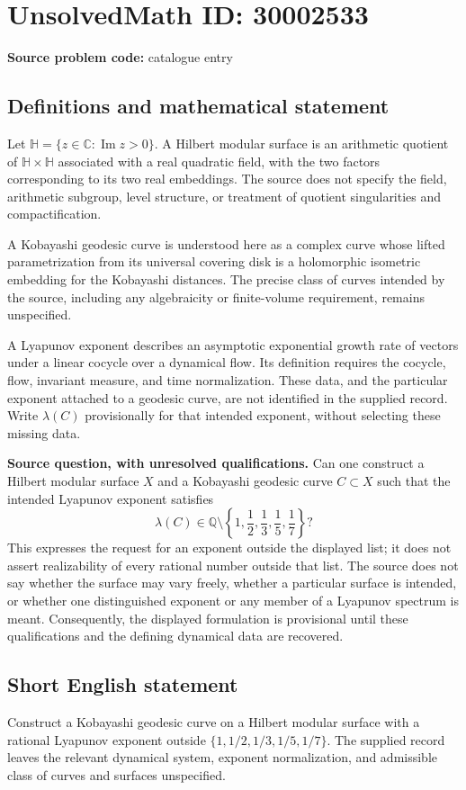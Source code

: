 \documentclass[11pt]{article}
\newcommand{\Q}{\mathbb{Q}}
\newcommand{\C}{\mathbb{C}}
\begin{document}
\section*{UnsolvedMath ID: 30002533}
\textbf{Source problem code:} catalogue entry
\subsection{Definitions and mathematical statement}
Let \(\mathbb H=\{z\in\C:\operatorname{Im}z>0\}\). A Hilbert modular surface is an arithmetic quotient of \(\mathbb H\times\mathbb H\) associated with a real quadratic field, with the two factors corresponding to its two real embeddings. The source does not specify the field, arithmetic subgroup, level structure, or treatment of quotient singularities and compactification.

A Kobayashi geodesic curve is understood here as a complex curve whose lifted parametrization from its universal covering disk is a holomorphic isometric embedding for the Kobayashi distances. The precise class of curves intended by the source, including any algebraicity or finite-volume requirement, remains unspecified.

A Lyapunov exponent describes an asymptotic exponential growth rate of vectors under a linear cocycle over a dynamical flow. Its definition requires the cocycle, flow, invariant measure, and time normalization. These data, and the particular exponent attached to a geodesic curve, are not identified in the supplied record. Write \(\lambda(C)\) provisionally for that intended exponent, without selecting these missing data.

\textbf{Source question, with unresolved qualifications.} Can one construct a Hilbert modular surface \(X\) and a Kobayashi geodesic curve \(C\subset X\) such that the intended Lyapunov exponent satisfies
\[
\lambda(C)\in\Q\setminus
\left\{1,\frac12,\frac13,\frac15,\frac17\right\}?
\]
This expresses the request for an exponent outside the displayed list; it does not assert realizability of every rational number outside that list. The source does not say whether the surface may vary freely, whether a particular surface is intended, or whether one distinguished exponent or any member of a Lyapunov spectrum is meant. Consequently, the displayed formulation is provisional until these qualifications and the defining dynamical data are recovered.
\subsection{Short English statement}
Construct a Kobayashi geodesic curve on a Hilbert modular surface with a rational Lyapunov exponent outside \(\{1,1/2,1/3,1/5,1/7\}\). The supplied record leaves the relevant dynamical system, exponent normalization, and admissible class of curves and surfaces unspecified.
\end{document}

